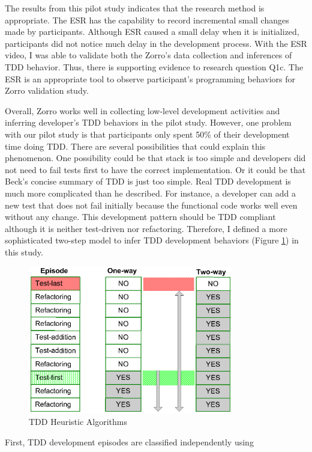 The results from this pilot study indicates that the research method is
appropriate. The ESR has the capability to record incremental small
changes made by participants. Although ESR caused a small delay
when it is initialized, participants did not notice much
delay in the development process. With the ESR video, I was able to
validate both the Zorro's data collection and inferences of TDD
behavior. Thus, there is supporting evidence to research question
Q1c. The ESR is an appropriate tool to observe participant's
programming behaviors for Zorro validation study.

Overall, Zorro works well in collecting low-level development
activities and inferring developer's TDD behaviors in the pilot
study. However, one problem with our pilot study is that participants
only spent 50\% of their development time doing TDD. There are several
possibilities that could explain this phenomenon. One possibility
could be that stack is too simple and developers did not need to fail
tests first to have the correct implementation. Or it could be that
Beck's concise summary of TDD is just too simple. Real TDD
development is much more complicated than he described. For instance,
a developer can add a new test that does not fail initially because
the functional code works well even without any change. This
development pattern should be TDD compliant although it is neither
test-driven nor refactoring. Therefore, I defined a more sophisticated
two-step model to infer TDD development behaviors (Figure
\ref{fig:heuristic}) in this study.
\begin{figure}[htbp]
  \centering
  \includegraphics[width=0.8\textwidth]{figs/HeuristicAlgorithms.eps}
  \caption{TDD Heuristic Algorithms}\label{fig:heuristic}
\end{figure}
First, TDD development episodes are classified independently using
